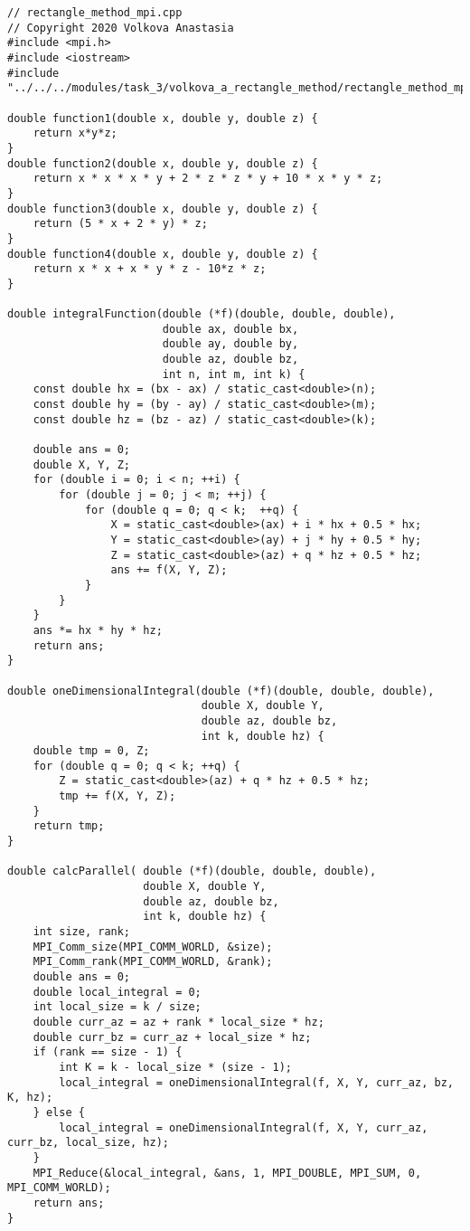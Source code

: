 \documentclass{report}
\begin{document}
\begin{lstlisting}
// rectangle_method_mpi.cpp
// Copyright 2020 Volkova Anastasia
#include <mpi.h>
#include <iostream>
#include "../../../modules/task_3/volkova_a_rectangle_method/rectangle_method_mpi.h"

double function1(double x, double y, double z) {
    return x*y*z;
}
double function2(double x, double y, double z) {
    return x * x * x * y + 2 * z * z * y + 10 * x * y * z;
}
double function3(double x, double y, double z) {
    return (5 * x + 2 * y) * z;
}
double function4(double x, double y, double z) {
    return x * x + x * y * z - 10*z * z;
}

double integralFunction(double (*f)(double, double, double),
                        double ax, double bx,
                        double ay, double by,
                        double az, double bz,
                        int n, int m, int k) {
    const double hx = (bx - ax) / static_cast<double>(n);
    const double hy = (by - ay) / static_cast<double>(m);
    const double hz = (bz - az) / static_cast<double>(k);

    double ans = 0;
    double X, Y, Z;
    for (double i = 0; i < n; ++i) {
        for (double j = 0; j < m; ++j) {
            for (double q = 0; q < k;  ++q) {
                X = static_cast<double>(ax) + i * hx + 0.5 * hx;
                Y = static_cast<double>(ay) + j * hy + 0.5 * hy;
                Z = static_cast<double>(az) + q * hz + 0.5 * hz;
                ans += f(X, Y, Z);
            }
        }
    }
    ans *= hx * hy * hz;
    return ans;
}

double oneDimensionalIntegral(double (*f)(double, double, double),
                              double X, double Y,
                              double az, double bz,
                              int k, double hz) {
    double tmp = 0, Z;
    for (double q = 0; q < k; ++q) {
        Z = static_cast<double>(az) + q * hz + 0.5 * hz;
        tmp += f(X, Y, Z);
    }
    return tmp;
}

double calcParallel( double (*f)(double, double, double),
                     double X, double Y,
                     double az, double bz,
                     int k, double hz) {
    int size, rank;
    MPI_Comm_size(MPI_COMM_WORLD, &size);
    MPI_Comm_rank(MPI_COMM_WORLD, &rank);
    double ans = 0;
    double local_integral = 0;
    int local_size = k / size;
    double curr_az = az + rank * local_size * hz;
    double curr_bz = curr_az + local_size * hz;
    if (rank == size - 1) {
        int K = k - local_size * (size - 1);
        local_integral = oneDimensionalIntegral(f, X, Y, curr_az, bz, K, hz);
    } else {
        local_integral = oneDimensionalIntegral(f, X, Y, curr_az, curr_bz, local_size, hz);
    }
    MPI_Reduce(&local_integral, &ans, 1, MPI_DOUBLE, MPI_SUM, 0, MPI_COMM_WORLD);
    return ans;
}


\end{lstlisting}
\end{document}

